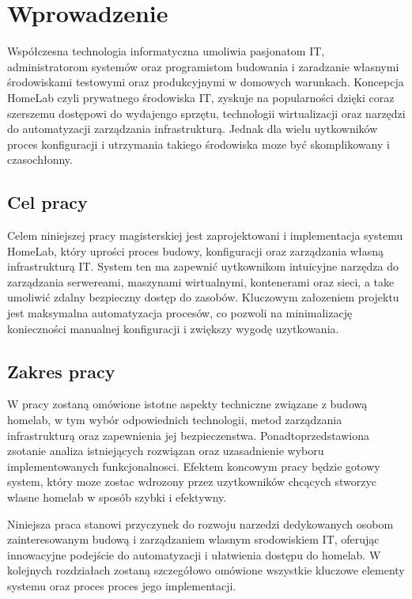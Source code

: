\chapter{Wprowadzenie}
Współczesna technologia informatyczna umoliwia pasjonatom IT, administratorom systemów oraz programistom budowania i zaradzanie własnymi środowiskami testowymi oraz produkcyjnymi
w domowych warunkach. Koncepcja HomeLab czyli prywatnego środowiska IT, zyskuje na popularności dzięki coraz szerszemu dostępowi do wydajengo sprzętu, technologii wirtualizacji oraz narzędzi do automatyzacji zarządzania infrastrukturą.
Jednak dla wielu uytkowników proces konfiguracji i utrzymania takiego środowiska moze być skomplikowany i czasochłonny.


\section{Cel pracy}
Celem niniejszej pracy magisterskiej jest zaprojektowani i implementacja systemu HomeLab, który uprości proces budowy, konfiguracji oraz zarządzania własną infrastrukturą IT. System ten ma zapewnić uytkownikom intuicyjne narzędza do zarządzania serwereami, maszynami wirtualnymi, kontenerami oraz sieci, a take umoliwić zdalny bezpieczny dostęp do zasobów. Kluczowym załozeniem projektu jest maksymalna automatyzacja procesów, co pozwoli na minimalizację konieczności manualnej konfiguracji i zwiększy wygodę uzytkowania.

\section{Zakres pracy}
W pracy zostaną omówione istotne aspekty techniczne związane z budową homelab, w tym wybór odpowiednich technologii, metod zarządzania infrastrukturą oraz zapewnienia jej bezpieczenstwa. Ponadtoprzedstawiona zsotanie analiza istniejących rozwiązan oraz uzasadnienie wyboru implementowanych funkcjonalnosci. Efektem koncowym pracy będzie gotowy system, który moze zostac wdrozony przez uzytkowników chcących stworzyc wlasne homelab w sposób szybki i efektywny. 

Niniejsza praca stanowi przyczynek do rozwoju narzedzi dedykowanych osobom zainteresowanym budową i zarządzaniem wlasnym srodowiskiem IT, oferując innowacyjne podejście do automatyzacji i ułatwienia dostępu do homelab. W kolejnych rozdziałach zostaną szczegółowo omówione wszystkie kluczowe elementy systemu oraz proces proces jego implementacji.